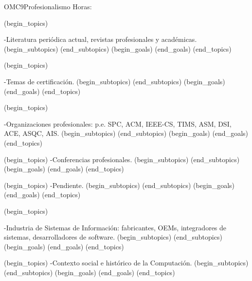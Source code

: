 \begin{BKL2}{OMC9}{Profesionalismo}
Horas:
 
(begin_topics)

-Literatura periódica actual, revistas profesionales y académicas.
(begin_subtopics)
(end_subtopics)
(begin_goals)
(end_goals)
(end_topics)

 

(begin_topics)

-Temas de certificación.
(begin_subtopics)
(end_subtopics)
(begin_goals)
(end_goals)
(end_topics)

 

(begin_topics)

-Organizaciones profesionales: p.e. SPC, ACM, IEEE-CS, TIMS, ASM, DSI, ACE,  ASQC, AIS.
(begin_subtopics)
(end_subtopics)
(begin_goals)
(end_goals)
(end_topics)

 

(begin_topics)
-Conferencias profesionales.
(begin_subtopics)
(end_subtopics)
(begin_goals)
(end_goals)
(end_topics)

 

(begin_topics)
-Pendiente.
(begin_subtopics)
(end_subtopics)
(begin_goals)
(end_goals)
(end_topics)

(begin_topics)

-Industria de Sistemas de Información: fabricantes, OEMs, integradores de sistemas, desarrolladores de software.
(begin_subtopics)
(end_subtopics)
(begin_goals)
(end_goals)
(end_topics)

 

(begin_topics)
-Contexto social e histórico de la Computación.
(begin_subtopics)
(end_subtopics)
(begin_goals)
(end_goals)
(end_topics)

\end{BKL2}



